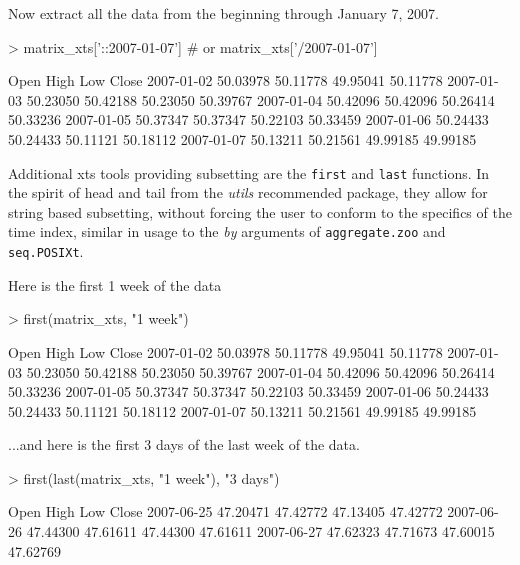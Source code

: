 \documentclass{article}
\begin{document}
Now extract all the data from the beginning through
January 7, 2007.
\begin{Schunk}
\begin{Sinput}
> matrix_xts['::2007-01-07'] # or matrix_xts['/2007-01-07']
\end{Sinput}
\end{Schunk}
\begin{Schunk}
\begin{Soutput}
               Open     High      Low    Close
2007-01-02 50.03978 50.11778 49.95041 50.11778
2007-01-03 50.23050 50.42188 50.23050 50.39767
2007-01-04 50.42096 50.42096 50.26414 50.33236
2007-01-05 50.37347 50.37347 50.22103 50.33459
2007-01-06 50.24433 50.24433 50.11121 50.18112
2007-01-07 50.13211 50.21561 49.99185 49.99185
\end{Soutput}
\end{Schunk}
Additional xts tools providing subsetting are the
{\tt first} and {\tt last} functions.
In the spirit of head and tail from
the {\em utils} recommended package, they allow
for string based subsetting, without forcing
the user to conform to the specifics of the
time index, similar in usage to the {\em by}
arguments of {\tt aggregate.zoo} and {\tt seq.POSIXt}.

Here is the first 1 week of the data
\begin{Schunk}
\begin{Sinput}
> first(matrix_xts, "1 week")
\end{Sinput}
\end{Schunk}
\begin{Schunk}
\begin{Soutput}
               Open     High      Low    Close
2007-01-02 50.03978 50.11778 49.95041 50.11778
2007-01-03 50.23050 50.42188 50.23050 50.39767
2007-01-04 50.42096 50.42096 50.26414 50.33236
2007-01-05 50.37347 50.37347 50.22103 50.33459
2007-01-06 50.24433 50.24433 50.11121 50.18112
2007-01-07 50.13211 50.21561 49.99185 49.99185
\end{Soutput}
\end{Schunk}

...and here is the first 3 days of the
last week of the data.
\begin{Schunk}
\begin{Sinput}
> first(last(matrix_xts, "1 week"), "3 days")
\end{Sinput}
\begin{Soutput}
               Open     High      Low    Close
2007-06-25 47.20471 47.42772 47.13405 47.42772
2007-06-26 47.44300 47.61611 47.44300 47.61611
2007-06-27 47.62323 47.71673 47.60015 47.62769
\end{Soutput}
\end{Schunk}
\end{document}
